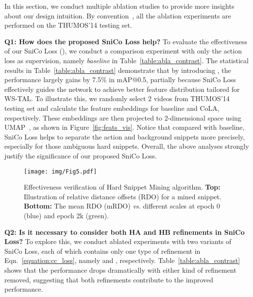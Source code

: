 \documentclass[final]{cvpr}
\begin{document}
\begin{table*}[t]
In this section, we conduct multiple ablation studies to provide more insights about our design intuition. By convention~\cite{nguyen2019weakly,shi2020weakly,lee2020background}, all the ablation experiments are performed on the THUMOS'14 testing set.

\textbf{Q1: How does the proposed SniCo Loss help?} To evaluate the effectiveness of our SniCo Loss (), we conduct a comparison experiment with only the action loss  as supervision, namely \textit{baseline} in Table~\ref{table:abla_contrast}. The statistical results in Table~\ref{table:abla_contrast} demonstrate that by introducing , the performance largely gains by 7.5\% in mAP@0.5, partially because SniCo Loss effectively guides the network to achieve better feature distribution tailored for WS-TAL. To illustrate this, we randomly select 2 videos from THUMOS'14 testing set and calculate the feature embeddings  for baseline and CoLA, respectively. These embeddings are then projected to 2-dimensional space using UMAP~\cite{2018arXivUMAP}, as shown in Figure~\ref{fig:feats_vis}. Notice that compared with baseline, SniCo Loss helps to separate the action and background snippets more precisely, especially for those ambiguous hard snippets. Overall, the above analyses strongly justify the significance of our proposed SniCo Loss. 

\begin{figure}[t]
\begin{center}
\texttt{[image: img/Fig5.pdf]}
\end{center}
   \caption{Effectiveness verification of Hard Snippet Mining algorithm. \textbf{Top:} Illustration of relative distance offsets (RDO) for a mined snippet. \textbf{Bottom:} The mean RDO (mRDO) \textit{vs.} different scales  at epoch 0 (blue) and epoch 2k (green). }
   \vspace{-6pt}
\label{fig:abla_context_loc}
\end{figure}

\textbf{Q2: Is it necessary to consider both HA and HB refinements in SniCo Loss?}
To explore this, we conduct ablated experiments with two variants of SniCo Loss, each of which contains only one type of refinement in Eqn.~\ref{equation:cc_loss}, namely  and , respectively. Table~\ref{table:abla_contrast} shows that the performance drops dramatically with either kind of refinement removed, suggesting that both refinements contribute to the improved performance. 


\end{table*}
\end{document}
